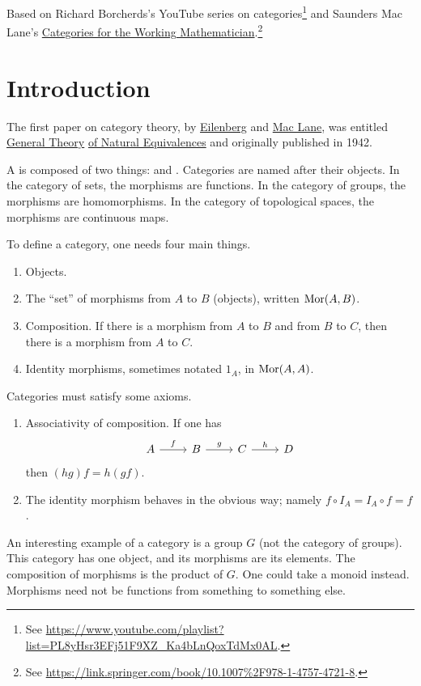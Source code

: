 \documentclass[11pt, twoside]{article}
\begin{document}
\maketitle
Based on {Richard Borcherds's YouTube series on categories}\footnote{See \url{https://www.youtube.com/playlist?list=PL8yHsr3EFj51F9XZ\_Ka4bLnQoxTdMx0AL}.} and Saunders Mac Lane's {\underline{Categories for the Working Mathematician}}.\footnote{See \url{https://link.springer.com/book/10.1007\%2F978-1-4757-4721-8}.} \color{black}\cite{CWM}
\tableofcontents
\section{Introduction}
The first paper on category theory, by \href{https://en.wikipedia.org/wiki/Samuel_Eilenberg}{\color{black}Eilenberg} and \href{https://en.wikipedia.org/wiki/Saunders_Mac_Lane}{\color{black}Mac Lane}, was entitled \underline{General Theory}  \underline{of Natural Equivalences} and originally published in 1942.

A \href{https://en.wikipedia.org/wiki/Category_(mathematics)}{} is composed of two things:  and . {Categories} are named after their objects. In the category of sets, the morphisms are functions. In the category of groups, the morphisms are homomorphisms. In the category of topological spaces, the morphisms are continuous maps.

To define a category, one needs four main things. 
\begin{enumerate}
\item Objects.
\item The ``set'' of morphisms from $A$ to $B$ (objects), written $\operatorname{Mor}( A, B)$.
\item Composition. If there is a morphism from $ A$ to $ B$ and from $ B$ to $ C$, then there is a morphism from $ A$ to $ C$.
\item Identity morphisms, sometimes notated $1_{ A}$, in $\operatorname{Mor}( A, A)$.
\end{enumerate}
Categories must satisfy some axioms.
\begin{enumerate}
\item Associativity of composition. If one has 
\[
\begin{tikzcd}
A\ar[r,"f"]&B\ar[r,"g"] & C\ar[r,"h"] & D
\end{tikzcd}
\]
then $(hg)f = h(gf)$.
\item The identity morphism behaves in the obvious way; namely $f\circ I_{ A} = I_{ A} \circ f = f$.
\end{enumerate}
An interesting example of a category is a group $G$ (not the category of groups). This category has one object, and its morphisms are its elements. The composition of morphisms is the product of $G$. One could take a monoid instead. Morphisms need not be functions from something to something else.
\end{document}
